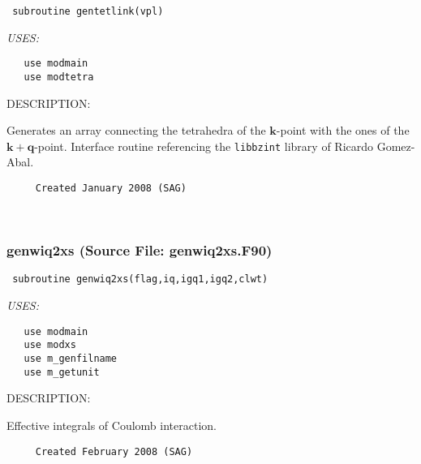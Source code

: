 \documentclass[11pt]{article}
\begin{document}
\begin{verbatim} subroutine gentetlink(vpl)\end{verbatim}{\em USES:}
\begin{verbatim}   use modmain
   use modtetra\end{verbatim}
{\sf DESCRIPTION:\\ }


     Generates an array connecting the tetrahedra of the $\mathbf{k}$-point with
     the ones of the  $\mathbf{k}+\mathbf{q}$-point. Interface routine
     referencing the {\tt libbzint} library of Ricardo Gomez-Abal.
  
\begin{verbatim}     Created January 2008 (SAG)\end{verbatim}






 
 
\mbox{}\hrulefill\ 
 
\subsubsection{genwiq2xs (Source File: genwiq2xs.F90)}


\begin{verbatim} subroutine genwiq2xs(flag,iq,igq1,igq2,clwt)\end{verbatim}{\em USES:}
\begin{verbatim}   use modmain
   use modxs
   use m_genfilname
   use m_getunit\end{verbatim}
{\sf DESCRIPTION:\\ }


     Effective integrals of Coulomb interaction.
  
\begin{verbatim}     Created February 2008 (SAG)\end{verbatim}


 
 
\end{document}
